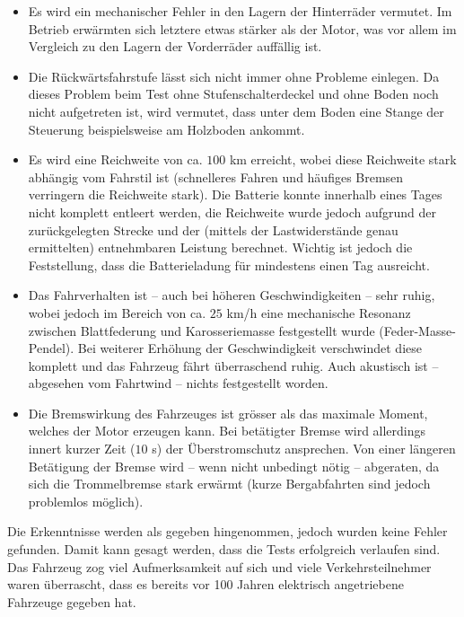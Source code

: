 \begin{itemize}
	\item Es wird ein mechanischer Fehler in den Lagern der Hinterräder vermutet. Im Betrieb erwärmten sich letztere etwas stärker als der Motor, was vor allem im Vergleich zu den Lagern der Vorderräder auffällig ist.
	\item Die Rückwärtsfahrstufe lässt sich nicht immer ohne Probleme einlegen. Da dieses Problem beim Test ohne Stufenschalterdeckel und ohne Boden noch nicht aufgetreten ist, wird vermutet, dass unter dem Boden eine Stange der Steuerung beispielsweise am Holzboden ankommt.
	\item Es wird eine Reichweite von ca. $100$ km erreicht, wobei diese Reichweite stark abhängig vom Fahrstil ist (schnelleres Fahren und häufiges Bremsen verringern die Reichweite stark). Die Batterie konnte innerhalb eines Tages nicht komplett entleert werden, die Reichweite wurde jedoch aufgrund der zurückgelegten Strecke und der (mittels der Lastwiderstände genau ermittelten) entnehmbaren Leistung berechnet. Wichtig ist jedoch die Feststellung, dass die Batterieladung für mindestens einen Tag ausreicht.
	\item Das Fahrverhalten ist -- auch bei höheren Geschwindigkeiten -- sehr ruhig, wobei jedoch im Bereich von ca. $25$ km/h eine mechanische Resonanz zwischen Blattfederung und Karosseriemasse festgestellt wurde (Feder-Masse-Pendel). Bei weiterer Erhöhung der Geschwindigkeit verschwindet diese komplett und das Fahrzeug fährt überraschend ruhig. Auch akustisch ist -- abgesehen vom Fahrtwind -- nichts festgestellt worden.
	\item Die Bremswirkung des Fahrzeuges ist grösser als das maximale Moment, welches der Motor erzeugen kann. Bei betätigter Bremse wird allerdings innert kurzer Zeit ($10$ s) der Überstromschutz ansprechen. Von einer längeren Betätigung der Bremse wird -- wenn nicht unbedingt nötig -- abgeraten, da sich die Trommelbremse stark erwärmt (kurze Bergabfahrten sind jedoch problemlos möglich).
\end{itemize}

Die Erkenntnisse werden als gegeben hingenommen, jedoch wurden keine Fehler gefunden. Damit kann gesagt werden, dass die Tests erfolgreich verlaufen sind. Das Fahrzeug zog viel Aufmerksamkeit auf sich und viele Verkehrsteilnehmer waren überrascht, dass es bereits vor 100 Jahren elektrisch angetriebene Fahrzeuge gegeben hat.

\newpage
\color{black}